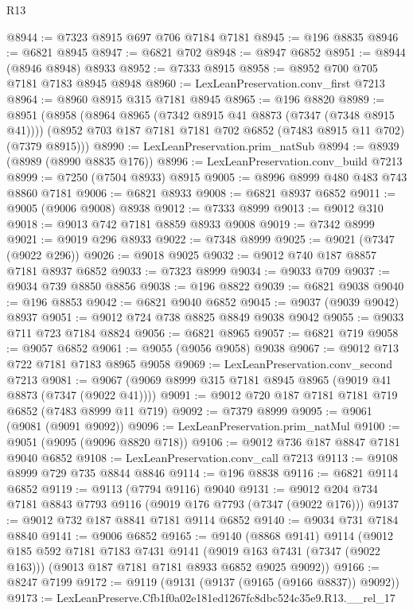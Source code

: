 \begin{lexlean}{R13}
\begin{coremodule}
@8944 := @7323 @8915 @697 @706 @7184 @7181
@8945 := @196 @8835
@8946 := @6821 @8945
@8947 := @6821 @702
@8948 := @8947 @6852
@8951 := @8944 (@8946 @8948) @8933
@8952 := @7333 @8915
@8958 := @8952 @700 @705 @7181 @7183 @8945 @8948
@8960 := LexLeanPreservation.conv_first @7213
@8964 := @8960 @8915 @315 @7181 @8945
@8965 := @196 @8820
@8989 := @8951
    (@8958
      (@8964 @8965 (@7342 @8915 @41 @8873 (@7347 (@7348 @8915 @41))))
      (@8952 @703 @187 @7181 @7181 @702 @6852 (@7483 @8915 @11 @702) (@7379 @8915)))
@8990 := LexLeanPreservation.prim_natSub
@8994 := @8939 (@8989 (@8990 @8835 @176))
@8996 := LexLeanPreservation.conv_build @7213
@8999 := @7250 (@7504 @8933) @8915
@9005 := @8996 @8999 @480 @483 @743 @8860 @7181
@9006 := @6821 @8933
@9008 := @6821 @8937 @6852
@9011 := @9005 (@9006 @9008) @8938
@9012 := @7333 @8999
@9013 := @9012 @310
@9018 := @9013 @742 @7181 @8859 @8933 @9008
@9019 := @7342 @8999
@9021 := @9019 @296 @8933
@9022 := @7348 @8999
@9025 := @9021 (@7347 (@9022 @296))
@9026 := @9018 @9025
@9032 := @9012 @740 @187 @8857 @7181 @8937 @6852
@9033 := @7323 @8999
@9034 := @9033 @709
@9037 := @9034 @739 @8850 @8856
@9038 := @196 @8822
@9039 := @6821 @9038
@9040 := @196 @8853
@9042 := @6821 @9040 @6852
@9045 := @9037 (@9039 @9042) @8937
@9051 := @9012 @724 @738 @8825 @8849 @9038 @9042
@9055 := @9033 @711 @723 @7184 @8824
@9056 := @6821 @8965
@9057 := @6821 @719
@9058 := @9057 @6852
@9061 := @9055 (@9056 @9058) @9038
@9067 := @9012 @713 @722 @7181 @7183 @8965 @9058
@9069 := LexLeanPreservation.conv_second @7213
@9081 := @9067 (@9069 @8999 @315 @7181 @8945 @8965 (@9019 @41 @8873 (@7347 (@9022 @41))))
@9091 := @9012 @720 @187 @7181 @7181 @719 @6852 (@7483 @8999 @11 @719)
@9092 := @7379 @8999
@9095 := @9061 (@9081 (@9091 @9092))
@9096 := LexLeanPreservation.prim_natMul
@9100 := @9051 (@9095 (@9096 @8820 @718))
@9106 := @9012 @736 @187 @8847 @7181 @9040 @6852
@9108 := LexLeanPreservation.conv_call @7213
@9113 := @9108 @8999 @729 @735 @8844 @8846
@9114 := @196 @8838
@9116 := @6821 @9114 @6852
@9119 := @9113 (@7794 @9116) @9040
@9131 := @9012 @204 @734 @7181 @8843 @7793 @9116 (@9019 @176 @7793 (@7347 (@9022 @176)))
@9137 := @9012 @732 @187 @8841 @7181 @9114 @6852
@9140 := @9034 @731 @7184 @8840
@9141 := @9006 @6852
@9165 := @9140
    (@8868 @9141)
    @9114
    (@9012
      @185
      @592
      @7181
      @7183
      @7431
      @9141
      (@9019 @163 @7431 (@7347 (@9022 @163)))
      (@9013 @187 @7181 @7181 @8933 @6852 @9025 @9092))
@9166 := @8247 @7199
@9172 := @9119 (@9131 (@9137 (@9165 (@9166 @8837)) @9092))
@9173 := LexLeanPreserve.Cfb1f0a02e181ed1267fc8dbc524c35e9.R13.__rel_17

\end{coremodule}
\end{lexlean}
